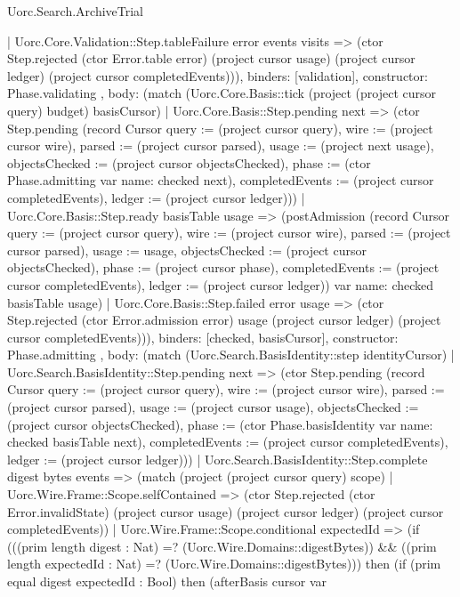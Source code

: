 \begin{lexlean}{Uorc.Search.ArchiveTrial}
\begin{semanticmodule}
{{{          | Uorc.Core.Validation::Step.tableFailure error events visits => (ctor Step.rejected (ctor Error.table error) (project cursor usage) (project cursor ledger) (project cursor completedEvents))),
        binders: [validation],
        constructor: Phase.validating
      },
      {
        body: (match (Uorc.Core.Basis::tick (project (project cursor query) budget) basisCursor)
          | Uorc.Core.Basis::Step.pending next => (ctor Step.pending (record Cursor {query := (project cursor query), wire := (project cursor wire), parsed := (project cursor parsed), usage := (project next usage), objectsChecked := (project cursor objectsChecked), phase := (ctor Phase.admitting var{
            name: checked
          } next), completedEvents := (project cursor completedEvents), ledger := (project cursor ledger)}))
          | Uorc.Core.Basis::Step.ready basisTable usage => (postAdmission (record Cursor {query := (project cursor query), wire := (project cursor wire), parsed := (project cursor parsed), usage := usage, objectsChecked := (project cursor objectsChecked), phase := (project cursor phase), completedEvents := (project cursor completedEvents), ledger := (project cursor ledger)}) var{
            name: checked
          } basisTable usage)
          | Uorc.Core.Basis::Step.failed error usage => (ctor Step.rejected (ctor Error.admission error) usage (project cursor ledger) (project cursor completedEvents))),
        binders: [checked, basisCursor],
        constructor: Phase.admitting
      },
      {
        body: (match (Uorc.Search.BasisIdentity::step identityCursor)
          | Uorc.Search.BasisIdentity::Step.pending next => (ctor Step.pending (record Cursor {query := (project cursor query), wire := (project cursor wire), parsed := (project cursor parsed), usage := (project cursor usage), objectsChecked := (project cursor objectsChecked), phase := (ctor Phase.basisIdentity var{
            name: checked
          } basisTable next), completedEvents := (project cursor completedEvents), ledger := (project cursor ledger)}))
          | Uorc.Search.BasisIdentity::Step.complete digest bytes events => (match (project (project cursor query) scope)
            | Uorc.Wire.Frame::Scope.selfContained => (ctor Step.rejected (ctor Error.invalidState) (project cursor usage) (project cursor ledger) (project cursor completedEvents))
            | Uorc.Wire.Frame::Scope.conditional expectedId => (if (((prim length digest : Nat) =? (Uorc.Wire.Domains::digestBytes)) && ((prim length expectedId : Nat) =? (Uorc.Wire.Domains::digestBytes))) then (if (prim equal digest expectedId : Bool) then (afterBasis cursor var{
}}}}
\end{semanticmodule}
\end{lexlean}
